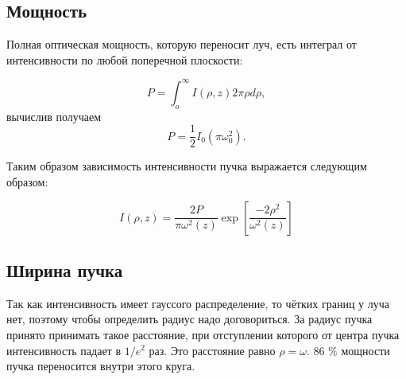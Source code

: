 \documentclass[a4paper,14pt]{extarticle}
\begin{document}
\subsection{Мощность}
Полная оптическая мощность, которую переносит луч, есть интеграл от интенсивности по любой поперечной плоскости: 

\begin{equation}
	P = \int_{o}^{\infty} I(\rho, z) 2 \pi \rho d\rho,
	\label{P}
\end{equation}	
вычислив получаем 
\begin{equation}
	P = \frac{1}{2} I_0 (\pi \omega_0^2).
\end{equation}

Таким образом зависимость интенсивности пучка выражается следующим образом: 

\begin{equation}
	\boxed{ I(\rho, z) = \frac{2P}{\pi \omega^2(z)} \exp \left[ \frac{-2 \rho^2}{\omega^2(z)} \right]}
	\label{IP}
\end{equation}

\subsection{Ширина пучка}

Так как интенсивность имеет гауссого распределение, то чётких границ у луча нет, поэтому чтобы определить радиус надо договориться. За радиус пучка принято принимать такое расстояние, при отступлении которого от центра пучка интенсивность падает в $1/e^2$ раз. Это расстояние равно $\rho = \omega$. 86 $\%$ мощности пучка переносится внутри этого круга. 
\end{document}
